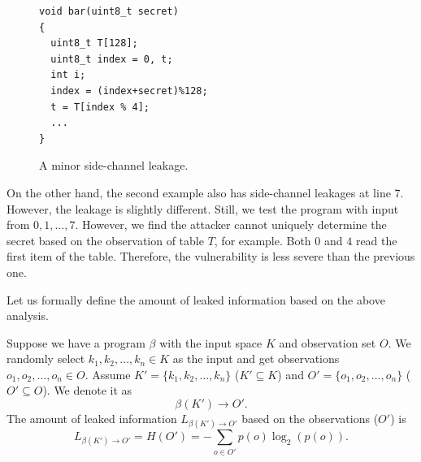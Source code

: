 \begin{figure}[h]
  \begin{minipage}{0.49\linewidth}
    \begin{lstlisting}[xleftmargin=.05\textwidth,xrightmargin=.08\textwidth]
void bar(uint8_t secret)
{
  uint8_t T[128];
  uint8_t index = 0, t;
  int i;
  index = (index+secret)%128;
  t = T[index % 4];
  ...
}
\end{lstlisting}
  \end{minipage}
  \hfill
  \begin{minipage}{0.42\linewidth}
  \end{minipage}
  \caption{A minor side-channel leakage. }\label{chapter5:fig:example2}
\end{figure}
On the other hand, the second example also has side-channel leakages at line 7. However, the leakage is slightly different. Still, we test the program with input from $0, 1, \dots, 7$. However, we find the attacker cannot uniquely determine the secret based on the observation of table $T$, for example. Both $0$ and $4$ read the first item of the table. Therefore, the vulnerability is less severe than the previous one.

Let us formally define the amount of leaked information based on the above analysis.

\begin{mydef}
  \label{chapter5:def}
    Suppose we have a program $\beta$ with the input space $K$ and observation set $O$. We randomly select $k_1, k_2, \ldots, k_n \in K$ as the input and get observations $o_1, o_2, \ldots, o_n \in O$. Assume $K'=\{k_1, k_2, \ldots, k_n\}$  ($K' \subseteq K$) and
    $O'=\{o_1, o_2, \ldots, o_n\}$  ($O' \subseteq O$).
    We denote it as
    $$\beta(K') \rightarrow	O'.$$
    The amount of leaked information $L_{\beta(K')\rightarrow O'}$ based on the observations ($O'$) is
    $$L_{\beta(K')\rightarrow O'} = H(O') = - \sum_{o {\in} O'}p(o)\log_2(p(o)). $$
\end{mydef}



